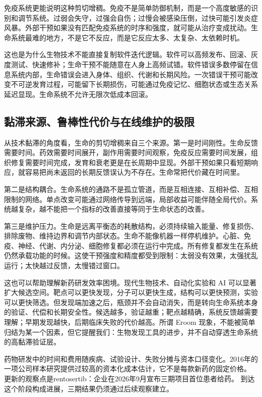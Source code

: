 免疫系统更能说明这种剪切增稠。免疫不是简单防御机制，而是一个高度敏感的识别和调节系统。过弱会失守，过强会自伤；过慢会被感染压倒，过快可能引发炎症风暴\cite{fajgenbaum2020cytokinestorm}。外部干预如果没有匹配免疫系统的时序和强度，就可能从治疗变成扰动。生命系统最难的地方，不是它不反应，而是它反应太多、太复杂、太依赖时机。

这也是为什么生物技术不能直接复制软件迭代逻辑。软件可以高频发布、回滚、灰度测试、快速修补；生命干预不能随意在人身上高频试错。软件错误多数停留在信息系统内部，生命错误会进入身体、组织、代谢和长期风险。一次错误干预可能改变不可逆发育过程，可能留下长期损伤，可能通过免疫记忆、细胞状态或生态关系延迟显现。生命系统不允许无限次低成本回滚。

\subsection{黏滞来源、鲁棒性代价与在线维护的极限}


从技术黏滞的角度看，生命的剪切增稠来自三个来源。第一是时间刚性。生命反馈需要时间。药效需要时间展开，副作用需要时间观察，免疫反应需要时间发展，组织修复需要时间完成，发育和衰老更是在长周期中显现。外部干预如果只看短期响应，就容易把尚未返回的长期反馈误认为不存在。生命常把代价藏在时间里。

第二是结构耦合。生命系统的通路不是孤立管道，而是互相连接、互相补偿、互相限制的网络。单点改变可能通过网络传导到远端，局部收益可能伴随全局代价。系统越复杂，越不能把一个指标的改善直接等同于生命状态的改善。

第三是维护压力。生命是远离平衡态的耗散结构，必须持续输入能量、修复损伤、排除废物、维持边界和调节内部状态。生命不能像机器一样停机维护。心脏、免疫、神经、代谢、内分泌、细胞修复都必须在运行中完成。所有修复都发生在系统仍然承载功能的时候。这使干预强度和精度都受到限制：太弱没有效果，太强扰乱运行；太快越过反馈，太慢错过窗口。

这也可以帮助理解新药研发效率困境。现代生物技术、自动化实验和 AI 可以显著扩大候选空间。靶点可以更快发现，分子可以更快生成，结构可以更快预测，实验可以更快筛选。但发现端加速之后，瓶颈并不会自动消失，而是转向生命系统本身的验证、代偿和长期安全性。候选越多，验证越重；靶点越精确，系统反馈越需要理解；早期发现越快，后期临床失败的代价越高。所谓 Eroom 现象\cite{scannell2012diagnosing}，不能被简单归结为某一个因素，但它提醒我们：生物发现工具的进步，并不自动穿透生命系统的高黏滞验证层。

药物研发中的时间和费用随疾病、试验设计、失败分摊与资本口径变化。2016年的一项公司样本研究提供过较高的资本化成本估计，它不是每款新药的固定价格。\cite{dimasi2016} 更新的观察点是rentosertib：企业在2026年9月宣布三期项目首位患者给药。\cite{insilico2026phase3} 到达这个阶段构成进展，三期结果仍须通过后续观察建立。

